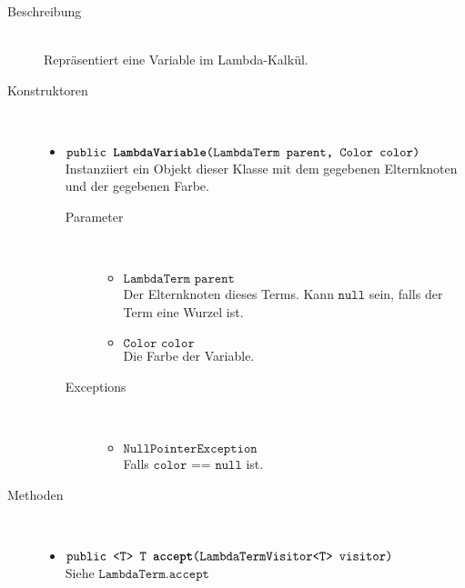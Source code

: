 \begin{description}
\item[Beschreibung] \hfill \\ Repräsentiert eine Variable im Lambda-Kalkül.

\item[Konstruktoren] \hfill \\
	\vspace{-.8cm}
	\begin{itemize}
		\item $\texttt{public \textbf{LambdaVariable}(LambdaTerm parent, Color color)}$ \\ Instanziiert ein Objekt dieser Klasse mit dem gegebenen Elternknoten und der gegebenen Farbe.
		\begin{description}
			\item[Parameter] \hfill \\
			\vspace{-.8cm}
			\begin{itemize}
				\item $\texttt{LambdaTerm parent}$ \\ Der Elternknoten dieses Terms. Kann $\texttt{null}$ sein, falls der Term eine Wurzel ist.
				\item $\texttt{Color color}$ \\ Die Farbe der Variable.
			\end{itemize}
			\item[Exceptions] \hfill \\
			\vspace{-.8cm}
			\begin{itemize}
				\item $\texttt{NullPointerException}$ \\ Falls $\texttt{color == null}$ ist.
			\end{itemize}
		\end{description}
	\end{itemize}
	
\item[Methoden] \hfill \\
	\vspace{-.8cm}
	\begin{itemize}
		\item $\texttt{public <T> T \textbf{accept}(LambdaTermVisitor<T> visitor)}$ \\ Siehe $\texttt{LambdaTerm.accept}$
	\end{itemize}
\end{description}


